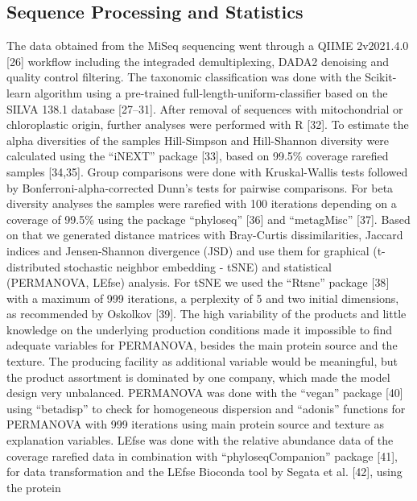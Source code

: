 \documentclass[preprint,3p,
a4paper]{elsarticle} %
\begin{document}
\hypertarget{sequence-processing-and-statistics}{%
\subsection{Sequence Processing and
Statistics}\label{sequence-processing-and-statistics}}

The data obtained from the MiSeq sequencing went through a QIIME
2\texttrademark v2021.4.0 {[}26{]} workflow including the integraded
demultiplexing, DADA2 denoising and quality control filtering. The
taxonomic classification was done with the Scikit-learn algorithm using
a pre-trained full-length-uniform-classifier based on the SILVA 138.1
database {[}27--31{]}. After removal of sequences with mitochondrial or
chloroplastic origin, further analyses were performed with R {[}32{]}.
To estimate the alpha diversities of the samples Hill-Simpson and
Hill-Shannon diversity were calculated using the ``iNEXT'' package
{[}33{]}, based on 99.5\% coverage rarefied samples {[}34,35{]}. Group
comparisons were done with Kruskal-Wallis tests followed by
Bonferroni-alpha-corrected Dunn's tests for pairwise comparisons. For
beta diversity analyses the samples were rarefied with 100 iterations
depending on a coverage of 99.5\% using the package ``phyloseq''
{[}36{]} and ``metagMisc'' {[}37{]}. Based on that we generated distance
matrices with Bray-Curtis dissimilarities, Jaccard indices and
Jensen-Shannon divergence (JSD) and use them for graphical
(t-distributed stochastic neighbor embedding - tSNE) and statistical
(PERMANOVA, LEfse) analysis. For tSNE we used the ``Rtsne'' package
{[}38{]} with a maximum of 999 iterations, a perplexity of 5 and two
initial dimensions, as recommended by Oskolkov {[}39{]}. The high
variability of the products and little knowledge on the underlying
production conditions made it impossible to find adequate variables for
PERMANOVA, besides the main protein source and the texture. The
producing facility as additional variable would be meaningful, but the
product assortment is dominated by one company, which made the model
design very unbalanced. PERMANOVA was done with the ``vegan'' package
{[}40{]} using ``betadisp'' to check for homogeneous dispersion and
``adonis'' functions for PERMANOVA with 999 iterations using main
protein source and texture as explanation variables. LEfse was done with
the relative abundance data of the coverage rarefied data in combination
with ``phyloseqCompanion'' package {[}41{]}, for data transformation and
the LEfse Bioconda tool by Segata et al. {[}42{]}, using the protein
\end{document}
